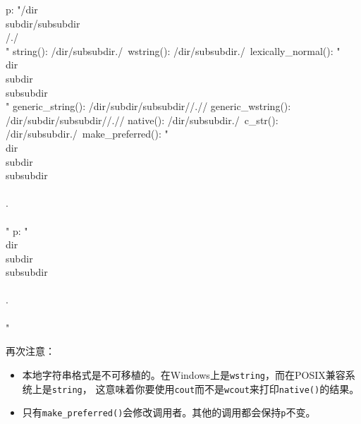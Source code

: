 \begin{blacklisting}
    p:                  "/dir\\subdir/subsubdir\\/./\\"
    string(): /dir\subdir/subsubdir\/./\
    wstring(): /dir\subdir/subsubdir\/./\
    lexically_normal(): "\\dir\\subdir\\subsubdir\\"
    generic_string(): /dir/subdir/subsubdir//.//
    generic_wstring(): /dir/subdir/subsubdir//.//
    native(): /dir\subdir/subsubdir\/./\
    c_str(): /dir\subdir/subsubdir\/./\
    make_preferred():   "\\dir\\subdir\\subsubdir\\\\.\\\\"
    p:                  "\\dir\\subdir\\subsubdir\\\\.\\\\"
\end{blacklisting}
再次注意：
\begin{itemize}
    \item 本地字符串格式是不可移植的。在Windows上是\texttt{wstring}，而在POSIX兼容系统上是\texttt{string}，
    这意味着你要使用\texttt{cout}而不是\texttt{wcout}来打印\texttt{native()}的结果。
    \item 只有\texttt{make\_preferred()}会修改调用者。其他的调用都会保持\texttt{p}不变。
\end{itemize}

